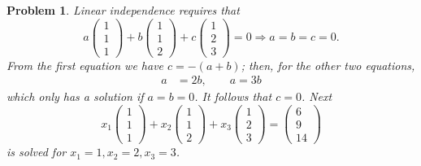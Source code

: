 \documentclass{article}
\theoremstyle{pprop}
\newtheorem{problem}{Problem}[section]
\begin{document}
\begin{problem}
Linear independence requires that 
$$
a\begin{pmatrix} 1 \\ 1 \\ 1\end{pmatrix}
+
b\begin{pmatrix} 1 \\ 1 \\ 2\end{pmatrix}
+
c\begin{pmatrix} 1 \\ 2 \\ 3\end{pmatrix}=0 \Rightarrow a=b=c=0.
$$  
From the first equation we have $c=-(a+b)$; then, for the other two equations,
\begin{align*}
a&=2b ,\qquad a=3b
\end{align*}
which only has a solution if $a=b=0$. It follows that $c=0$. Next 
$$
x_1\begin{pmatrix} 1 \\ 1 \\ 1\end{pmatrix}
+x_2\begin{pmatrix} 1 \\ 1 \\ 2\end{pmatrix}
+x_3\begin{pmatrix} 1 \\ 2 \\ 3\end{pmatrix}=\begin{pmatrix} 6 \\ 9 \\ 14\end{pmatrix}
$$
is solved for $x_1=1,x_2=2,x_3=3$.
\end{problem}
\end{document}
